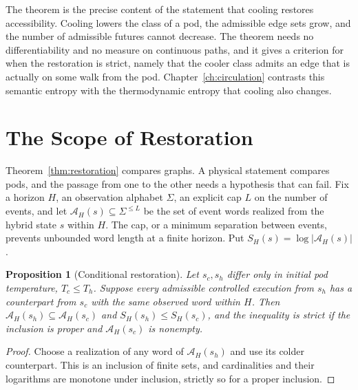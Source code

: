 \documentclass[11pt,openany]{book}
\theoremstyle{plain}
\newtheorem{proposition}[theorem]{Proposition}
\theoremstyle{definition}
\theoremstyle{remark}
\begin{document}
The theorem is the precise content of the statement that cooling restores accessibility. Cooling lowers the class of a pod, the admissible edge sets grow, and the number of admissible futures cannot decrease. The theorem needs no differentiability and no measure on continuous paths, and it gives a criterion for when the restoration is strict, namely that the cooler class admits an edge that is actually on some walk from the pod. Chapter~\ref{ch:circulation} contrasts this semantic entropy with the thermodynamic entropy that cooling also changes.

\section{The Scope of Restoration}

Theorem~\ref{thm:restoration} compares graphs. A physical statement compares pods, and the passage from one to the other needs a hypothesis that can fail. Fix a horizon $H$, an observation alphabet $\Sigma$, an explicit cap $L$ on the number of events, and let $\mathcal A_H(s)\subseteq\Sigma^{\le L}$ be the set of event words realized from the hybrid state $s$ within $H$. The cap, or a minimum separation between events, prevents unbounded word length at a finite horizon. Put $S_H(s)=\log|\mathcal A_H(s)|$.

\begin{proposition}[Conditional restoration]
\label{prop:condrest}
Let $s_c,s_h$ differ only in initial pod temperature, $T_c\le T_h$. Suppose every admissible controlled execution from $s_h$ has a counterpart from $s_c$ with the same observed word within $H$. Then $\mathcal A_H(s_h)\subseteq\mathcal A_H(s_c)$ and $S_H(s_h)\le S_H(s_c)$, and the inequality is strict if the inclusion is proper and $\mathcal A_H(s_c)$ is nonempty.
\end{proposition}
\begin{proof}
Choose a realization of any word of $\mathcal A_H(s_h)$ and use its colder counterpart. This is an inclusion of finite sets, and cardinalities and their logarithms are monotone under inclusion, strictly so for a proper inclusion.
\end{proof}
\end{document}
